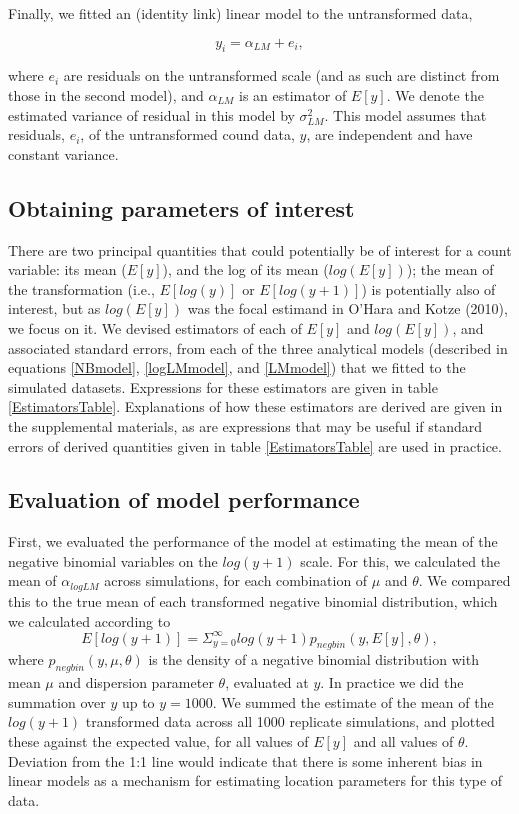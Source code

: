 \documentclass[]{article}
\begin{document}
Finally, we fitted an (identity link) linear model to the untransformed
data,

\begin{equation}\label{LMmodel}
y_i = \alpha_{LM} + e_i,
\end{equation}

where \(e_i\) are residuals on the untransformed scale (and as such are
distinct from those in the second model), and \(\alpha_{LM}\) is an
estimator of \(E[y]\). We denote the estimated variance of residual in
this model by \(\sigma^2_{LM}\). This model assumes that residuals,
\(e_i\), of the untransformed cound data, \(y\), are independent and
have constant variance.

\subsection{Obtaining parameters of
interest}\label{obtaining-parameters-of-interest}

There are two principal quantities that could potentially be of interest
for a count variable: its mean (\(E[y]\)), and the log of its mean
(\(log(E[y])\)); the mean of the transformation (i.e., \(E[log(y)]\) or
\(E[log(y+1)]\)) is potentially also of interest, but as \(log(E[y])\)
was the focal estimand in O'Hara and Kotze (2010), we focus on it. We
devised estimators of each of \(E[y]\) and \(log(E[y])\), and associated
standard errors, from each of the three analytical models (described in
equations \ref{NBmodel}, \ref{logLMmodel}, and \ref{LMmodel}) that we
fitted to the simulated datasets. Expressions for these estimators are
given in table \ref{EstimatorsTable}. Explanations of how these
estimators are derived are given in the supplemental materials, as are
expressions that may be useful if standard errors of derived quantities
given in table \ref{EstimatorsTable} are used in practice.

\subsection{Evaluation of model
performance}\label{evaluation-of-model-performance}

First, we evaluated the performance of the model at estimating the mean
of the negative binomial variables on the \(log(y+1)\) scale. For this,
we calculated the mean of \(\alpha_{logLM}\) across simulations, for
each combination of \(\mu\) and \(\theta\). We compared this to the true
mean of each transformed negative binomial distribution, which we
calculated according to \[
E[log(y+1)] = \Sigma_{y=0}^\infty log(y+1) p_{negbin}(y,E[y],\theta) ,
\] where \(p_{negbin}(y,\mu,\theta)\) is the density of a negative
binomial distribution with mean \(\mu\) and dispersion parameter
\(\theta\), evaluated at \(y\). In practice we did the summation over
\(y\) up to \(y = 1000\). We summed the estimate of the mean of the
\(log(y+1)\) transformed data across all 1000 replicate simulations, and
plotted these against the expected value, for all values of \(E[y]\) and
all values of \(\theta\). Deviation from the 1:1 line would indicate
that there is some inherent bias in linear models as a mechanism for
estimating location parameters for this type of data.
\end{document}
